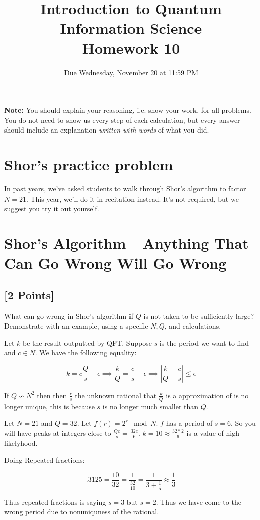 \documentclass[11pt]{article}
\newcommand{\abs}[1]{\left\lvert #1\right\rvert}
\providecommand{\due}{Due Wednesday, November 20 at 11:59 PM}
\begin{document}
\title{Introduction to Quantum Information Science\\Homework 10}
\date{\due}

\maketitle

\textbf{Note:} You should explain your reasoning, i.e. show your work, for all problems. You do not need to show us every step of each calculation, but every answer should include an explanation \emph{written with words} of what you did.

\section*{Shor's practice problem}
In past years, we've asked students to walk through Shor's algorithm to factor $N=21$. This year, we'll do it in recitation instead. It's not required, but we suggest you try it out yourself.






\section{Shor's Algorithm---Anything That Can Go Wrong Will Go Wrong}

\subsection{[2 Points]} What can go wrong in Shor's algorithm if $Q$ is not taken to be
sufficiently large?  Demonstrate with an example, using a specific $N, Q$, and calculations.

\begin{solution}
    Let $k$ be the result outputted by QFT. Suppose $s$ is the period we want to find and $c \in N$. We have the following equality: 
    
    \[k = c\frac{Q}{s} \pm \epsilon \implies \frac{k}{Q} = \frac{c}{s} \pm \epsilon \implies \abs{\frac{k}{Q} - \frac{c}{s}} \leq \epsilon\]

    If $Q \not \sim N^2$ then then $\frac{c}{s}$ the unknown rational that $\frac{k}{Q}$ is a approximation of is no longer unique, this is because $s$ is no longer much smaller than $Q$. 
    
    Let $N = 21$ and $Q = 32$. Let $f(r) = 2^r \mod N$. $f$ has a period of $s = 6$. So you will have peaks at integers close to $\frac{Qc}{s} = \frac{32 c}{6}$. $k = 10 \approx \frac{32 * 2}{6}$ is a value of high likelyhood. 
    
    Doing Repeated fractions: 

    \[.3125 = \frac{10}{32} = \frac{1}{\frac{32}{10}} = \frac{1}{3 + \frac{1}{5}} \approx \frac{1}{3}\]

    Thus repeated fractions is saying $s = 3$ but $s = 2$. Thus we have come to the wrong period due to nonuniquness of the rational.  
\end{solution}
\end{document}
